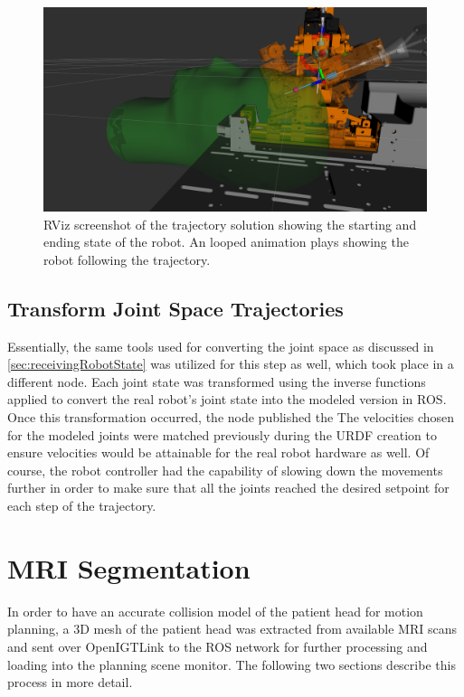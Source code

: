 \documentclass[12pt]{report}
\begin{document}
\begin{figure}[thpb]
	\centering
	\includegraphics[width = \textwidth]{images/motion_plan_rviz.png}
    \caption{RViz screenshot of the trajectory solution showing the starting and ending state of the robot. An looped animation plays showing the robot following the trajectory.}
    \label{fig:motionPlanRViz}
\end{figure}


\section{Transform Joint Space Trajectories}
Essentially, the same tools used for converting the joint space as discussed in \autoref{sec:receivingRobotState} was utilized for this step as well, which took place in a different node. Each joint state was transformed using the inverse functions applied to convert the real robot's joint state into the modeled version in ROS. Once this transformation occurred, the node published the  The velocities chosen for the modeled joints were matched previously during the URDF creation to ensure velocities would be attainable for the real robot hardware as well. Of course, the robot controller had the capability of slowing down the movements further in order to make sure that all the joints reached the desired setpoint for each step of the trajectory. 


\chapter{MRI Segmentation}
\label{sec:mriSegmentation}
In order to have an accurate collision model of the patient head for motion planning, a 3D mesh of the patient head was extracted from available MRI scans and sent over OpenIGTLink to the ROS network for further processing and loading into the planning scene monitor. The following two sections describe this process in more detail.
\end{document}
